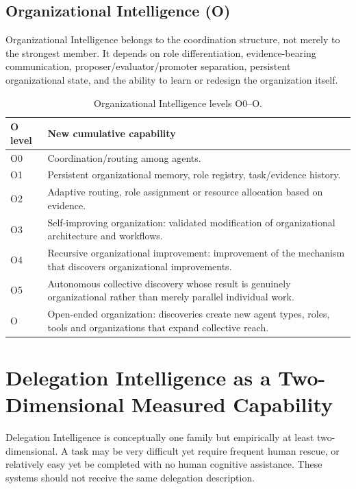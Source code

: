 \subsection{Organizational Intelligence (O)}

Organizational Intelligence belongs to the coordination structure, not merely to the strongest member. It depends on role differentiation, evidence-bearing communication, proposer/evaluator/promoter separation, persistent organizational state, and the ability to learn or redesign the organization itself.

\begin{table}[!htbp]
\centering\small
\begin{tabularx}{\textwidth}{@{}lY@{}}
\toprule
O level & New cumulative capability \\
\midrule
O0 & Coordination/routing among agents. \\
O1 & Persistent organizational memory, role registry, task/evidence history. \\
O2 & Adaptive routing, role assignment or resource allocation based on evidence. \\
O3 & Self-improving organization: validated modification of organizational architecture and workflows. \\
O4 & Recursive organizational improvement: improvement of the mechanism that discovers organizational improvements. \\
O5 & Autonomous collective discovery whose result is genuinely organizational rather than merely parallel individual work. \\
O\Om{} & Open-ended organization: discoveries create new agent types, roles, tools and organizations that expand collective reach. \\
\bottomrule
\end{tabularx}
\caption{Organizational Intelligence levels O0--O\Om{}.}
\label{tab:o}
\end{table}

\section{Delegation Intelligence as a Two-Dimensional Measured Capability}

Delegation Intelligence is conceptually one family but empirically at least two-dimensional. A task may be very difficult yet require frequent human rescue, or relatively easy yet be completed with no human cognitive assistance. These systems should not receive the same delegation description.


